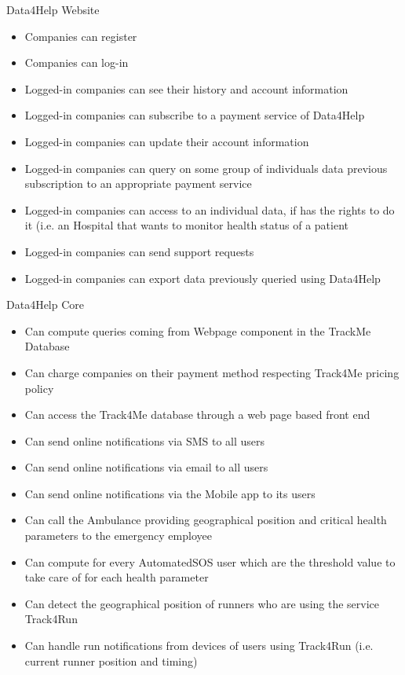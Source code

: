 \noindent Data4Help Website
\begin{itemize}
    \item Companies can register
    \item Companies can log-in
    \item Logged-in companies can see their history and account information
    \item Logged-in companies can subscribe to a payment service of Data4Help
    \item Logged-in companies can update their account information
    \item Logged-in companies can query on some group of individuals data
    previous subscription to an appropriate payment service 
    \item Logged-in companies can access to an individual data, if has the rights to do it (i.e. an Hospital that wants to monitor health status of a patient
    \item Logged-in companies can send support requests
    \item Logged-in companies can export data previously queried using Data4Help
\end{itemize}

\noindent Data4Help Core
\begin{itemize}
\item Can compute queries coming from Webpage component in the TrackMe Database
\item Can charge companies on their payment method respecting Track4Me pricing policy
\item Can access the Track4Me database through a web page based front end
\item Can send online notifications via SMS to all users 
\item Can send online notifications via email to all users
\item Can send online notifications via the Mobile app to its users

\item Can call the Ambulance providing geographical position and critical health parameters to the emergency employee 
\item Can compute for every AutomatedSOS user which are the threshold value to take care of for each health parameter

\item Can detect the geographical position of runners who are using the service Track4Run
\item Can handle run notifications from devices of users using Track4Run (i.e. current runner position and timing)
\end{itemize}
